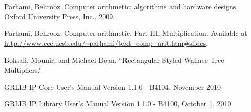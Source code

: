 
\begin{thebibliography}{15}

Parhami, Behrooz. Computer arithmetic: algorithms and hardware designs. Oxford University Press, Inc., 2009.

Parhami, Behrooz. Computer arithmetic: Part III, Multiplication. Available at \url{http://www.ece.ucsb.edu/~parhami/text_comp_arit.htm#slides}.

Bohsali, Mounir, and Michael Doan. ``Rectangular Styled Wallace Tree Multipliers.''

GRLIB IP Core User's Manual Version 1.1.0 - B4104, November 2010

GRLIB IP Library User's Manual Version 1.1.0 - B4100, October 1, 2010



\end{thebibliography}
